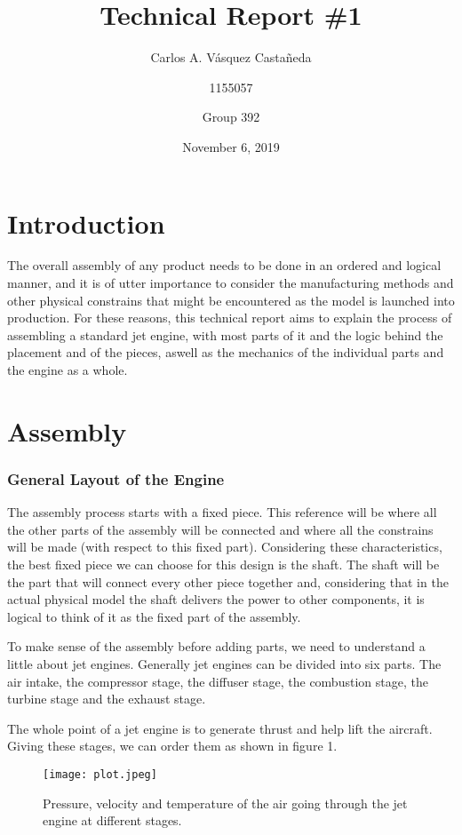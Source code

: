 \documentclass[12pt, letterpaper]{article}
\title{Technical Report \#1}
\author{Carlos A. Vásquez Castañeda \and 1155057 \and Group 392}
\date{November 6, 2019}
\begin{document}
\maketitle
\section*{Introduction}

The overall assembly of any product needs to be done in an ordered and logical manner, and it is of utter importance to consider the manufacturing methods and other physical constrains that might be encountered as the model is launched into production. For these reasons, this technical report aims to explain the process of assembling a standard jet engine, with most parts of it and the logic behind the placement and of the pieces, aswell as the mechanics of the individual parts and the engine as a whole.

\section*{Assembly}
\subsubsection*{General Layout of the Engine}
The assembly process starts with a fixed piece. This reference will be where all the other parts of the assembly will be connected and where all the constrains will be made (with respect to this fixed part). Considering these characteristics, the best fixed piece we can choose for this design is the shaft. The shaft will be the part that will connect every other piece together and, considering that in the actual physical model the shaft delivers the power to other components, it is logical to think of it as the fixed part of the assembly.

To make sense of the assembly before adding parts, we need to understand a little about jet engines. Generally jet engines can be divided into six parts. The air intake, the compressor stage, the diffuser stage, the combustion stage, the turbine stage and the exhaust stage.

The whole point of a jet engine is to generate thrust and help lift the aircraft. Giving these stages, we can order them as shown in figure 1.

\begin{figure}[H]
	\centering
	\texttt{[image: plot.jpeg]}
	\caption{Pressure, velocity and temperature of the air going through the jet engine at different stages.}
\end{figure}
\end{document}
